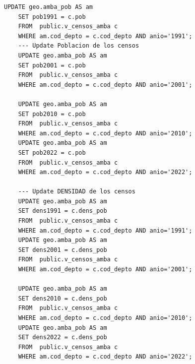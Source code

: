 \documentclass{article}
\theoremstyle{mytheoremstyle}
\theoremstyle{mytheoremstyle}
\theoremstyle{myproblemstyle}
\begin{document}
\begin{lstlisting}[caption={CreateTables.sql},label={lst:sql_CreateTables}]
    UPDATE geo.amba_pob AS am
    SET pob1991 = c.pob
    FROM  public.v_censos_amba c
    WHERE am.cod_depto = c.cod_depto AND anio='1991';
    --- Update Poblacion de los censos
    UPDATE geo.amba_pob AS am
    SET pob2001 = c.pob
    FROM  public.v_censos_amba c
    WHERE am.cod_depto = c.cod_depto AND anio='2001';
    
    UPDATE geo.amba_pob AS am
    SET pob2010 = c.pob
    FROM  public.v_censos_amba c
    WHERE am.cod_depto = c.cod_depto AND anio='2010';
    UPDATE geo.amba_pob AS am
    SET pob2022 = c.pob
    FROM  public.v_censos_amba c
    WHERE am.cod_depto = c.cod_depto AND anio='2022';
    
    --- Update DENSIDAD de los censos
    UPDATE geo.amba_pob AS am
    SET dens1991 = c.dens_pob
    FROM  public.v_censos_amba c
    WHERE am.cod_depto = c.cod_depto AND anio='1991';
    UPDATE geo.amba_pob AS am
    SET dens2001 = c.dens_pob
    FROM  public.v_censos_amba c
    WHERE am.cod_depto = c.cod_depto AND anio='2001';
    
    UPDATE geo.amba_pob AS am
    SET dens2010 = c.dens_pob
    FROM  public.v_censos_amba c
    WHERE am.cod_depto = c.cod_depto AND anio='2010';
    UPDATE geo.amba_pob AS am
    SET dens2022 = c.dens_pob
    FROM  public.v_censos_amba c
    WHERE am.cod_depto = c.cod_depto AND anio='2022';
    
  \end{lstlisting}
\end{document}
